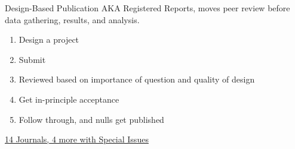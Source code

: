 \documentclass{beamer}
\begin{document}
\begin{frame}{Design-Based Publication}
AKA Registered Reports, moves peer review before data gathering, results, and analysis.

\begin{enumerate}[<.->]
\item Design a project
\item Submit
\item Reviewed based on importance of question and quality of design
\item Get in-principle acceptance
\item Follow through, and nulls get published
\end{enumerate}
\href{https://osf.io/8mpji/wiki/home/}{14 Journals, 4 more with Special Issues }
\end{frame}

{ %
    \begin{frame}[plain]
     \end{frame}
}
\end{document}
